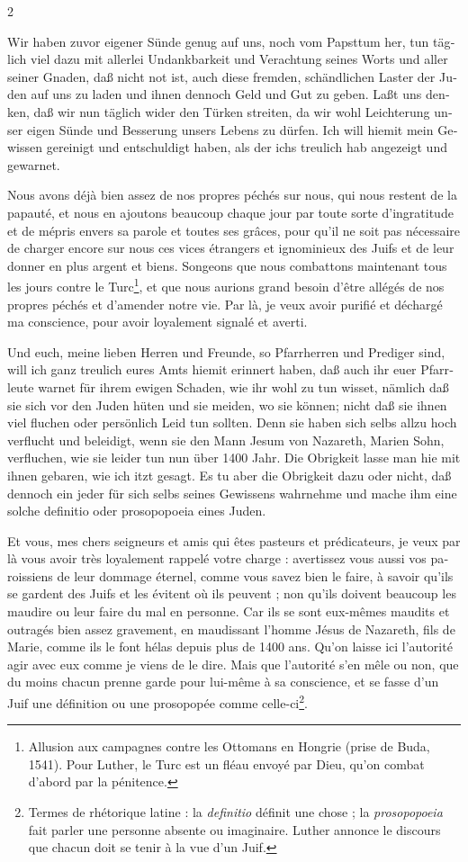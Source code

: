 \documentclass[a4paper,12pt]{article}
\newcommand\chunks[2]{%
\begin{leftcolumn*}\begin{otherlanguage}{german}%
{#1}%
\end{otherlanguage}\end{leftcolumn*}%
\begin{rightcolumn}\begin{otherlanguage}{french}%
{#2}%
\end{otherlanguage}\end{rightcolumn}%
}
\begin{document}
\begin{paracol}{2}
  \chunks{Wir haben zuvor eigener Sünde genug auf uns, noch vom Papsttum her, tun täglich viel dazu mit allerlei Undankbarkeit und Verachtung seines Worts und aller seiner Gnaden, daß nicht not ist, auch diese fremden, schändlichen Laster der Juden auf uns zu laden und ihnen dennoch Geld und Gut zu geben. Laßt uns denken, daß wir nun täglich wider den Türken streiten, da wir wohl Leichterung unser eigen Sünde und Besserung unsers Lebens zu dürfen. Ich will hiemit mein Gewissen gereinigt und entschuldigt haben, als der ichs treulich hab angezeigt und gewarnet.}
         {Nous avons déjà bien assez de nos propres péchés sur nous, qui nous restent de la papauté, et nous en ajoutons beaucoup chaque jour par toute sorte d’ingratitude et de mépris envers sa parole et toutes ses grâces, pour qu’il ne soit pas nécessaire de charger encore sur nous ces vices étrangers et ignominieux des Juifs et de leur donner en plus argent et biens. Songeons que nous combattons maintenant tous les jours contre le Turc\footnote{Allusion aux campagnes contre les Ottomans en Hongrie (prise de Buda, 1541). Pour Luther, le Turc est un fléau envoyé par Dieu, qu’on combat d’abord par la pénitence.}, et que nous aurions grand besoin d’être allégés de nos propres péchés et d’amender notre vie. Par là, je veux avoir purifié et déchargé ma conscience, pour avoir loyalement signalé et averti.}
  \chunks{Und euch, meine lieben Herren und Freunde, so Pfarrherren und Prediger sind, will ich ganz treulich eures Amts hiemit erinnert haben, daß auch ihr euer Pfarrleute warnet für ihrem ewigen Schaden, wie ihr wohl zu tun wisset, nämlich daß sie sich vor den Juden hüten und sie meiden, wo sie können; nicht daß sie ihnen viel fluchen oder persönlich Leid tun sollten. Denn sie haben sich selbs allzu hoch verflucht und beleidigt, wenn sie den Mann Jesum von Nazareth, Marien Sohn, verfluchen, wie sie leider tun nun über 1400 Jahr. Die Obrigkeit lasse man hie mit ihnen gebaren, wie ich itzt gesagt. Es tu aber die Obrigkeit dazu oder nicht, daß dennoch ein jeder für sich selbs seines Gewissens wahrnehme und mache ihm eine solche definitio oder prosopopoeia eines Juden.}
         {Et vous, mes chers seigneurs et amis qui êtes pasteurs et prédicateurs, je veux par là vous avoir très loyalement rappelé votre charge : avertissez vous aussi vos paroissiens de leur dommage éternel, comme vous savez bien le faire, à savoir qu’ils se gardent des Juifs et les évitent où ils peuvent ; non qu’ils doivent beaucoup les maudire ou leur faire du mal en personne. Car ils se sont eux-mêmes maudits et outragés bien assez gravement, en maudissant l’homme Jésus de Nazareth, fils de Marie, comme ils le font hélas depuis plus de 1400 ans. Qu’on laisse ici l’autorité agir avec eux comme je viens de le dire. Mais que l’autorité s’en mêle ou non, que du moins chacun prenne garde pour lui-même à sa conscience, et se fasse d’un Juif une définition ou une prosopopée comme celle-ci\footnote{Termes de rhétorique latine : la \emph{definitio} définit une chose ; la \emph{prosopopoeia} fait parler une personne absente ou imaginaire. Luther annonce le discours que chacun doit se tenir à la vue d’un Juif.}.}

\end{paracol}
\end{document}
